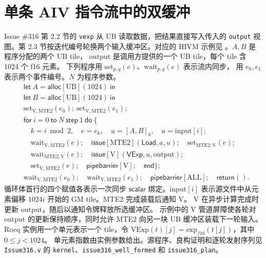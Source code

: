 \documentclass[UTF8,a4paper,11pt,fontset=fandol]{ctexart}
\newcommand{\kw}[1]{\mathsf{#1}}
\begin{document}
\section{单条 AIV 指令流中的双缓冲}
Issue \#316 第 2.2 节的 \texttt{vexp} 从 UB 读取数据，把结果直接写入传入的
\texttt{output} 视图。第 2.3 节按迭代编号轮换两个输入缓冲区。对应的 HIVM 示例见
。\(A,B\) 是程序分配的两个 UB tile，
\(\mathrm{output}\) 是调用方提供的一个 UB tile，每个 tile 含 1024 个 f16 元素。
下列程序用 \(\mathrm{set}_{p,q}(e)\)、\(\mathrm{wait}_{p,q}(e)\) 表示流内同步，
用 \(e_0,e_1\) 表示两个事件编号。\(N\) 为程序参数。
\[
\begin{aligned}
 &\kw{let}\ A=\kw{alloc}[\mathrm{UB}](1024)\ \kw{in}\\
 &\kw{let}\ B=\kw{alloc}[\mathrm{UB}](1024)\ \kw{in}\\
 &\mathrm{set}_{\mathrm V,\mathrm{MTE2}}(e_0);
   \ \mathrm{set}_{\mathrm V,\mathrm{MTE2}}(e_1);\\
 &\kw{for}\ i=0\ \kw{to}\ N\ \kw{step}\ 1\ \kw{do}\ \{\\
 &\quad k=i\bmod 2,\quad e=e_k,\quad u=[A,B]_k,\quad
      a=\mathrm{input}[i];\\
 &\quad \mathrm{wait}_{\mathrm V,\mathrm{MTE2}}(e);
       \quad\kw{issue}[\mathrm{MTE2}](\kw{Load},a,u);
       \quad\mathrm{set}_{\mathrm{MTE2},\mathrm V}(e);\\
 &\quad \mathrm{wait}_{\mathrm{MTE2},\mathrm V}(e);
       \quad\kw{issue}[\mathrm V](\kw{VExp},u,\mathrm{output});\\
 &\quad \mathrm{set}_{\mathrm V,\mathrm{MTE2}}(e);
       \quad\kw{pipebarrier}[\mathrm V];\quad\kw{end}\};\\
 &\mathrm{wait}_{\mathrm V,\mathrm{MTE2}}(e_0);
   \quad\mathrm{wait}_{\mathrm V,\mathrm{MTE2}}(e_1);
   \quad\kw{pipebarrier}[\mathrm{ALL}];\quad\kw{return}().
\end{aligned}
\]
循环体首行的四个赋值各表示一次同步 \(\kw{scalar}\) 绑定。\(\mathrm{input}[i]\)
表示源文件中从元素偏移 \(1024i\) 开始的 GM tile。MTE2 完成装载后通知 V。
V 在异步计算完成时更新 \(\mathrm{output}\)，随后以通知令牌释放所选缓冲区。
示例中的 V 管道屏障使各轮对 \(\mathrm{output}\) 的更新保持顺序，同时允许 MTE2
向另一块 UB 缓冲区装载下一轮输入。Rocq 实例用一个单元表示一个 tile，令
\(\mathrm{VExp}(t)[j]=\mathrm{exp}_{f16}(t[j])\)，其中 \(0\le j<1024\)。
单元素指数由实例参数给出。源程序、良构证明和逐轮发射序列见
\texttt{Issue316.v} 的 \texttt{kernel}、\texttt{issue316\_well\_formed} 和 \texttt{issue316\_plan}。
\end{document}
